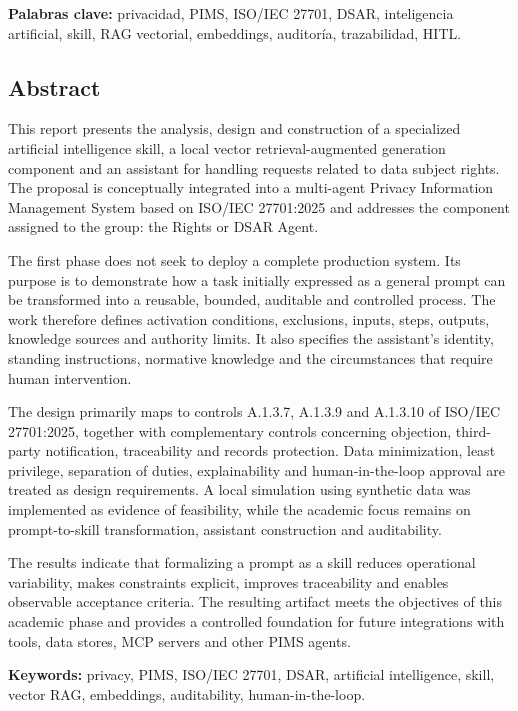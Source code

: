 \documentclass[11pt,a4paper]{article}
\begin{document}
\textbf{Palabras clave:} privacidad, PIMS, ISO/IEC 27701, DSAR, inteligencia artificial, skill, RAG vectorial, embeddings, auditoría, trazabilidad, HITL.

\vspace{0.6cm}
\subsection*{Abstract}

This report presents the analysis, design and construction of a specialized artificial intelligence skill, a local vector retrieval-augmented generation component and an assistant for handling requests related to data subject rights. The proposal is conceptually integrated into a multi-agent Privacy Information Management System based on ISO/IEC 27701:2025 and addresses the component assigned to the group: the Rights or DSAR Agent.

The first phase does not seek to deploy a complete production system. Its purpose is to demonstrate how a task initially expressed as a general prompt can be transformed into a reusable, bounded, auditable and controlled process. The work therefore defines activation conditions, exclusions, inputs, steps, outputs, knowledge sources and authority limits. It also specifies the assistant's identity, standing instructions, normative knowledge and the circumstances that require human intervention.

The design primarily maps to controls A.1.3.7, A.1.3.9 and A.1.3.10 of ISO/IEC 27701:2025, together with complementary controls concerning objection, third-party notification, traceability and records protection. Data minimization, least privilege, separation of duties, explainability and human-in-the-loop approval are treated as design requirements. A local simulation using synthetic data was implemented as evidence of feasibility, while the academic focus remains on prompt-to-skill transformation, assistant construction and auditability.

The results indicate that formalizing a prompt as a skill reduces operational variability, makes constraints explicit, improves traceability and enables observable acceptance criteria. The resulting artifact meets the objectives of this academic phase and provides a controlled foundation for future integrations with tools, data stores, MCP servers and other PIMS agents.

\textbf{Keywords:} privacy, PIMS, ISO/IEC 27701, DSAR, artificial intelligence, skill, vector RAG, embeddings, auditability, human-in-the-loop.
\end{document}
